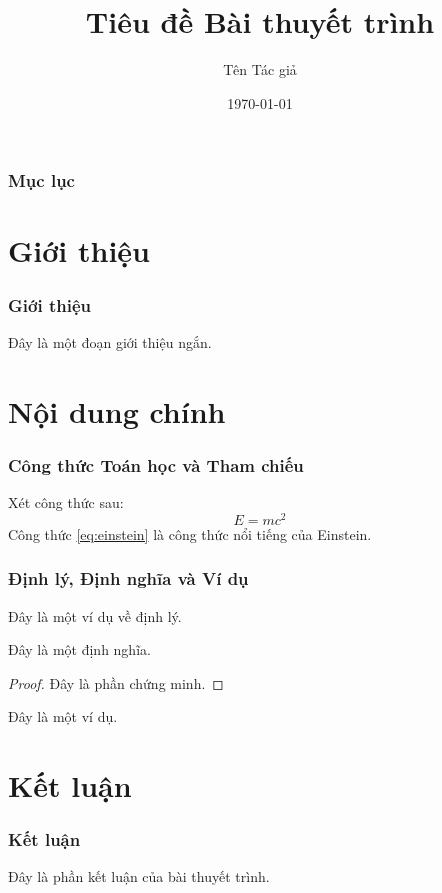 \documentclass{beamer}
\title{Tiêu đề Bài thuyết trình}
\author{Tên Tác giả}
\date{\today}
\begin{document}
\begin{frame}
    \titlepage
\end{frame}

\begin{frame}
    \frametitle{Mục lục}
    \tableofcontents
\end{frame}

\section{Giới thiệu}

\begin{frame}
    \frametitle{Giới thiệu}
    Đây là một đoạn giới thiệu ngắn.
\end{frame}

\section{Nội dung chính}

\begin{frame}
    \frametitle{Công thức Toán học và Tham chiếu}
    Xét công thức sau:
    \begin{equation}
        E = mc^2
        \label{eq:einstein}
    \end{equation}
    Công thức \cref{eq:einstein} là công thức nổi tiếng của Einstein.
\end{frame}

\begin{frame}
    \frametitle{Định lý, Định nghĩa và Ví dụ}
    \begin{theorem}
        Đây là một ví dụ về định lý.
    \end{theorem}

    \begin{definition}
        Đây là một định nghĩa.
    \end{definition}

    \begin{proof}
        Đây là phần chứng minh.
    \end{proof}

    \begin{example}
        Đây là một ví dụ.
    \end{example}
\end{frame}

\section{Kết luận}

\begin{frame}
    \frametitle{Kết luận}
    Đây là phần kết luận của bài thuyết trình.
\end{frame}
\end{document}
